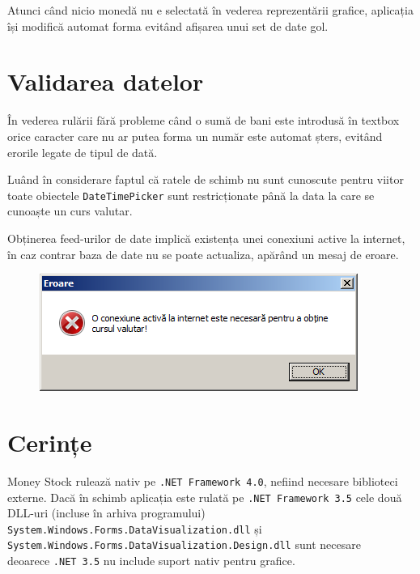 \documentclass[13pt,a4paper]{report}
\begin{document}
Atunci când nicio monedă nu e selectată în vederea reprezentării grafice,
aplicația își modifică automat forma evitând afișarea unui set de date gol.

\section{Validarea datelor}
În vederea rulării fără probleme când o sumă de bani este introdusă în
textbox orice caracter care nu ar putea forma un număr este automat șters,
evitând erorile legate de tipul de dată.

Luând în considerare faptul că ratele de schimb nu sunt cunoscute pentru viitor
toate obiectele \texttt{DateTimePicker} sunt restricționate până la data la care
se cunoaște un curs valutar.

Obținerea feed-urilor de date implică existența unei conexiuni active la
internet, în caz contrar baza de date nu se poate actualiza, apărând un mesaj de
eroare.

\begin{figure}[htb]
\centering
\includegraphics[scale=0.7]{img/error.png}
\end{figure}

\section{Cerințe}
Money Stock rulează nativ pe \texttt{.NET Framework 4.0}, nefiind necesare
biblioteci externe.
Dacă în schimb aplicația este rulată pe \texttt{.NET Framework 3.5} cele două
DLL-uri (incluse în arhiva programului) \texttt{System.Windows.Forms.DataVisualization.dll} 
și \texttt{System.Windows.Forms.DataVisualization.Design.dll} sunt necesare \\
deoarece \texttt{.NET 3.5} nu include suport nativ pentru grafice.
\end{document}
